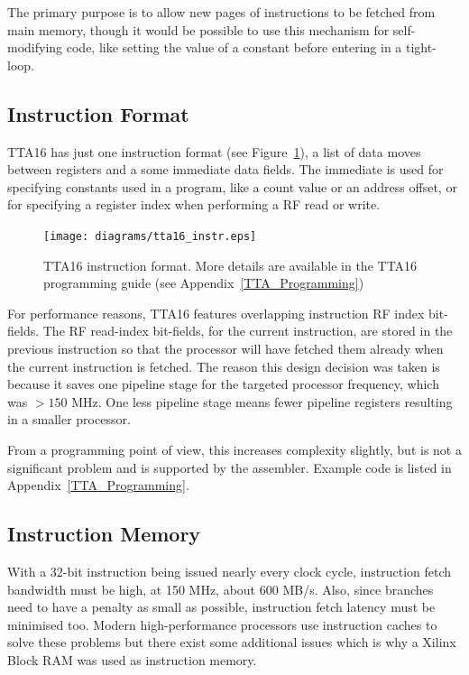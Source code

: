 The primary purpose is to allow new pages of instructions to be fetched from main
memory, though it would be possible to use this mechanism for self-modifying
code, like setting the value of a constant before entering in a tight-loop.


\subsection{Instruction Format}
TTA16 has just one instruction format (see Figure~\ref{TTA_Instruction_Format}),
a list of data moves between registers and a some immediate data fields. The
immediate is used for specifying constants used in a program, like a count
value or an address offset, or for specifying a register index when performing
a RF read or write.

\begin{figure}[h!]
\begin{center}
\texttt{[image: diagrams/tta16\_instr.eps]}
\caption[TTA16 instruction format]{TTA16 instruction format. More details are
available in the TTA16 programming guide (see Appendix~\ref{TTA_Programming})}
\label{TTA_Instruction_Format}
\end{center}
\end{figure}

For performance reasons, TTA16 features overlapping instruction RF index
bit-fields. The RF read-index bit-fields, for the current instruction, are stored
in the previous instruction so that the processor will have fetched them already
when the current instruction is fetched. The reason this design decision was
taken is because it saves one pipeline stage for the targeted processor
frequency, which was $>150$ MHz. One less pipeline stage means fewer pipeline
registers resulting in a smaller processor.

From a programming point of view, this increases complexity slightly, but is not
a significant problem and is supported by the assembler. Example code is listed
in Appendix~\ref{TTA_Programming}.


\subsection{Instruction Memory}
\label{TTA_Instr_Mem}
With a 32-bit instruction being issued nearly every clock cycle, instruction
fetch bandwidth must be high, at 150 MHz, about 600 MB/s. Also, since branches
need to have a penalty as small as possible, instruction fetch latency must be
minimised too. Modern high-performance processors use instruction caches to
solve these problems but there exist some additional issues which is why a Xilinx
Block RAM was used
as instruction memory.

